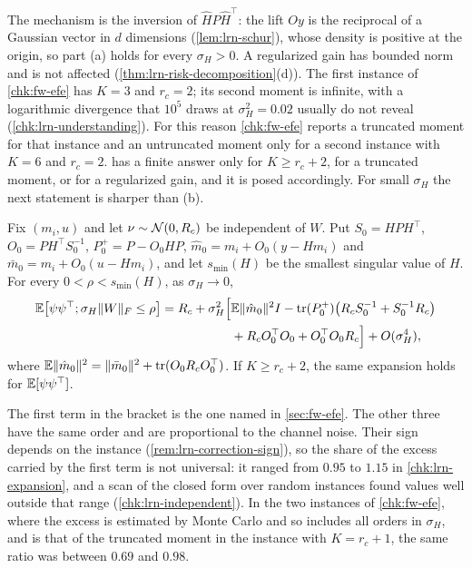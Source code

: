 The mechanism is the inversion of $\hat HP\hat H^\top$: the lift $Oy$ is the reciprocal of a Gaussian vector in $d$ dimensions (\cref{lem:lrn-schur}), whose density is positive at the origin, so part (a) holds for every $\sigma_H>0$. A regularized gain has bounded norm and is not affected (\cref{thm:lrn-risk-decomposition}(d)). The first instance of \cref{chk:fw-efe} has $K=3$ and $r_c=2$; its second moment is infinite, with a logarithmic divergence that $10^5$ draws at $\sigma_H^2=0.02$ usually do not reveal (\cref{chk:lrn-understanding}). For this reason \cref{chk:fw-efe} reports a truncated moment for that instance and an untruncated moment only for a second instance with $K=6$ and $r_c=2$.  has a finite answer only for $K\ge r_c+2$, for a truncated moment, or for a regularized gain, and it is posed accordingly. For small $\sigma_H$ the next statement is sharper than (b).

\begin{proposition}\label{prop:lrn-understanding-expansion}
Fix $(m_i,u)$ and let $\nu\sim\mathcal{N}(0,R_c)$ be independent of $W$. Put $S_0=HPH^\top$, $O_0=PH^\top S_0^{-1}$, $P_0^+=P-O_0HP$, $\hat m_0=m_i+O_0(y-Hm_i)$ and $\bar m_0=m_i+O_0(u-Hm_i)$, and let $s_{\min}(H)$ be the smallest singular value of $H$. For every $0<\rho<s_{\min}(H)$, as $\sigma_H\to0$,
\begin{equation}\label{eq:lrn-understanding-expansion}
\begin{aligned}
\mathbb{E}\bigl[\psi\psi^\top;\sigma_H\Vert W\Vert_F\le\rho\bigr]=R_c+\sigma_H^2\Bigl[&\mathbb{E}\Vert\hat m_0\Vert^2I-\operatorname{tr}(P_0^+)\bigl(R_cS_0^{-1}+S_0^{-1}R_c\bigr)\\
&+R_cO_0^\top O_0+O_0^\top O_0R_c\Bigr]+O(\sigma_H^4),
\end{aligned}
\end{equation}
where $\mathbb{E}\Vert\hat m_0\Vert^2=\Vert\bar m_0\Vert^2+\operatorname{tr}(O_0R_cO_0^\top)$. If $K\ge r_c+2$, the same expansion holds for $\mathbb{E}[\psi\psi^\top]$.
\end{proposition}

The first term in the bracket is the one named in \cref{sec:fw-efe}. The other three have the same order and are proportional to the channel noise. Their sign depends on the instance (\cref{rem:lrn-correction-sign}), so the share of the excess carried by the first term is not universal: it ranged from $0.95$ to $1.15$ in \cref{chk:lrn-expansion}, and a scan of the closed form over random instances found values well outside that range (\cref{chk:lrn-independent}). In the two instances of \cref{chk:fw-efe}, where the excess is estimated by Monte Carlo and so includes all orders in $\sigma_H$, and is that of the truncated moment in the instance with $K=r_c+1$, the same ratio was between $0.69$ and $0.98$.

